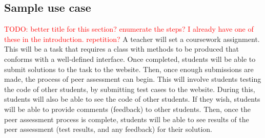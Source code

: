 \documentclass[a4paper,11pt]{report}
\newcommand{\todo}[1]{\textcolor{red}{TODO: #1}}
\begin{document}
\subsection*{Sample use case}
\todo{better title for this section? enumerate the steps? I already have one of these in the introduction. repetition?}
A teacher will set a coursework assignment. This will be a task that requires a class with methods to be produced that conforms with a well-defined interface. Once completed, students will be able to submit solutions to the task to the website. Then, once enough submissions are made, the process of peer assessment can begin. This will involve students testing the code of other students, by submitting test cases to the website. During this, students will also be able to see the code of other students. If they wish, students will be able to provide comments (feedback) to other students. Then, once the peer assessment process is complete, students will be able to see results of the peer assessment (test results, and any feedback) for their solution.
\end{document}
